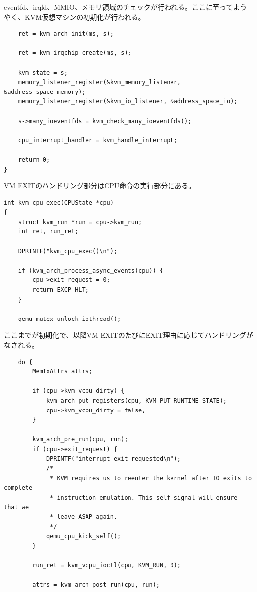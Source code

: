 ﻿\documentclass[9pt,b5paper,tombo,openany]{jsbook}
\begin{document}
eventfd、irqfd、MMIO、メモリ領域のチェックが行われる。ここに至ってようやく、KVM仮想マシンの初期化が行われる。

\begin{lstlisting}
    ret = kvm_arch_init(ms, s);

    ret = kvm_irqchip_create(ms, s);

    kvm_state = s;
    memory_listener_register(&kvm_memory_listener, &address_space_memory);
    memory_listener_register(&kvm_io_listener, &address_space_io);

    s->many_ioeventfds = kvm_check_many_ioeventfds();

    cpu_interrupt_handler = kvm_handle_interrupt;

    return 0;
}
\end{lstlisting}

VM EXITのハンドリング部分はCPU命令の実行部分にある。

\begin{lstlisting}
int kvm_cpu_exec(CPUState *cpu)
{
    struct kvm_run *run = cpu->kvm_run;
    int ret, run_ret;

    DPRINTF("kvm_cpu_exec()\n");

    if (kvm_arch_process_async_events(cpu)) {
        cpu->exit_request = 0;
        return EXCP_HLT;
    }

    qemu_mutex_unlock_iothread();
\end{lstlisting}

ここまでが初期化で、以降VM EXITのたびにEXIT理由に応じてハンドリングがなされる。

\begin{lstlisting}
    do {
        MemTxAttrs attrs;

        if (cpu->kvm_vcpu_dirty) {
            kvm_arch_put_registers(cpu, KVM_PUT_RUNTIME_STATE);
            cpu->kvm_vcpu_dirty = false;
        }

        kvm_arch_pre_run(cpu, run);
        if (cpu->exit_request) {
            DPRINTF("interrupt exit requested\n");
            /*
             * KVM requires us to reenter the kernel after IO exits to complete
             * instruction emulation. This self-signal will ensure that we
             * leave ASAP again.
             */
            qemu_cpu_kick_self();
        }

        run_ret = kvm_vcpu_ioctl(cpu, KVM_RUN, 0);

        attrs = kvm_arch_post_run(cpu, run);
\end{lstlisting}
\end{document}
